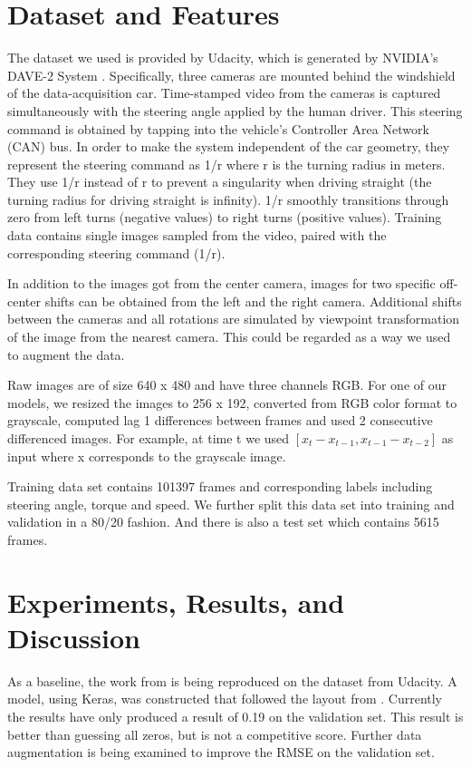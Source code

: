 \documentclass[10pt,twocolumn,letterpaper]{article}
\begin{document}
\section{Dataset and Features}
The dataset we used is provided by Udacity, which is generated by NVIDIA’s DAVE-2 System \cite{bojarski2016end}. Specifically, three cameras are mounted behind the windshield of the data-acquisition car. Time-stamped video from the cameras is captured simultaneously with the steering angle applied by the human driver. This steering command is obtained by tapping into the vehicle’s Controller Area Network (CAN) bus. In order to make the system independent of the car geometry, they represent the steering command as 1/r where r is the turning radius in meters. They use 1/r instead of r to prevent a singularity when driving straight (the turning radius for driving straight is infinity). 1/r smoothly transitions through zero from left turns (negative values) to right turns (positive values). Training data contains single images sampled from the video, paired with the corresponding steering command (1/r).

In addition to the images got from the center camera, images for two specific off-center shifts can be obtained from the left and the right camera. Additional shifts between the cameras and all rotations are simulated by viewpoint transformation of the image from the nearest camera. This could be regarded as a way we used to augment the data.

Raw images are of size 640 x 480 and have three channels RGB. For one of our models, we resized the images to 256 x 192, converted from RGB color format to grayscale, computed lag 1 differences between frames and used 2 consecutive differenced images. For example, at time t we used $[x_{t} - x_{t-1}, x_{t-1} - x_{t-2}]$ as input where x corresponds to the grayscale image.

Training data set contains 101397 frames and corresponding labels including steering angle, torque and speed. We further split this data set into training and validation in a 80/20 fashion. And there is also a test set which contains 5615 frames. 

\section{Experiments, Results, and Discussion}
As a baseline, the work from \cite{bojarski2016end} is being reproduced on the dataset from Udacity. A model, using Keras, was constructed that followed the layout from \cite{bojarski2016end}. Currently the results have only produced a result of 0.19 on the validation set. This result is better than guessing all zeros, but is not a competitive score. Further data augmentation is being examined to improve the RMSE on the validation set.
\end{document}
